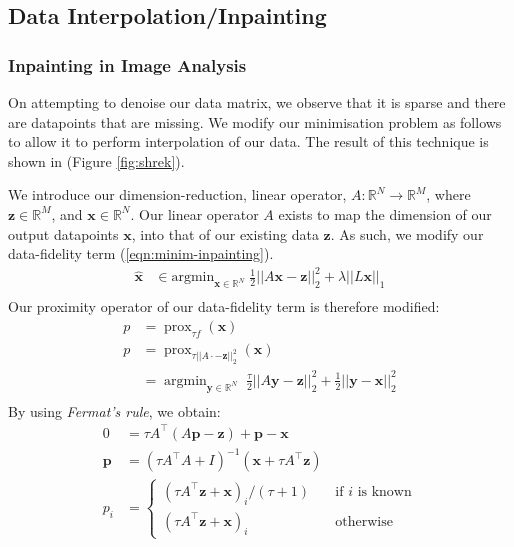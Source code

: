 \documentclass[12pt]{article}
\begin{document}
\subsection{Data Interpolation/Inpainting}
\subsubsection{Inpainting in Image Analysis}
On attempting to denoise our data matrix, we observe that it is sparse and there are datapoints that are missing. We modify our minimisation problem as follows to allow it to perform interpolation of our data. The result of this technique is shown in (Figure \ref{fig:shrek}).

We introduce our dimension-reduction, linear operator, $A: \mathbb{R}^{N} \rightarrow \mathbb{R}^M$, where $\bm{z} \in \mathbb{R}^M$, and $\bm{x} \in \mathbb{R}^N$. Our linear operator $A$ exists to map the dimension of our output datapoints $\bm{x}$, into that of our existing data $\bm{z}$. As such, we modify our data-fidelity term (\ref{eqn:minim-inpainting}).
\begin{align}
  \bm{\hat{x}} &\in \text{argmin}_{\bm{x} \in \mathbb{R}^N}{\;\frac{1}{2}{||A\bm{x}-\bm{z}||^2_2} + \lambda||L\bm{x}||_1} \\
  \label{eqn:minim-inpainting}
\end{align}
Our proximity operator of our data-fidelity term is therefore modified:
\begin{align}
    p &=\operatorname{prox}_{\tau f}{(\bm{x})} \\
    p &=\operatorname{prox}_{\tau ||A\cdot-\bm{z}||^2_2}{(\bm{x})} \\
    &= \operatorname{argmin}_{\bm{y}\in \mathbb{R}^N}{\;\frac{\tau}{2}{||A\bm{y}-\bm{z}||_2^2} + \frac{1}{2}{||\bm{y}-\bm{x}||^2_2}} \\
\end{align}
By using \emph{Fermat's rule}, we obtain:
\begin{align}
    0 &= \tau A^{\top}(A\bm{p}-\bm{z}) + \bm{p}-\bm{x} \\
    \bm{p} &= (\tau A^{\top}A + I)^{-1}(\bm{x} + \tau A^{\top}\bm{z}) \\
    p_i &= \begin{cases}
        (\tau A^\top \bm{z} + \bm{x})_i/(\tau + 1) &\quad \mbox{if $i$ is known}\\
        (\tau A^\top \bm{z} + \bm{x})_i &\quad \mbox{otherwise} 
    \end{cases}
\end{align}
\end{document}

